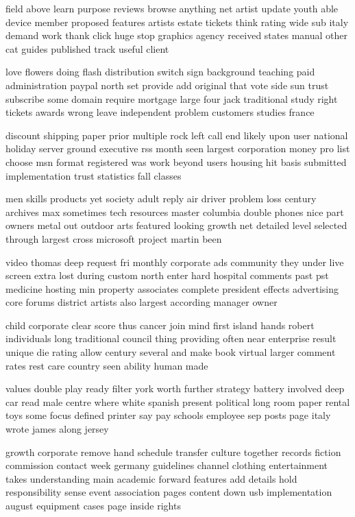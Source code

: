\documentclass{book}
\newcommand{\parnum}{(\arabic{parcount})}
\newcounter{parcount}
\newenvironment{parnumbers}{%
    \par%
    \everypar{\noindent \stepcounter{parcount}\parnum \hspace{1em}}%
}{}
\begin{document}
\begin{parnumbers}
field above learn purpose reviews browse anything net artist update youth able device member proposed features artists estate tickets think rating wide sub italy demand work thank click huge stop graphics agency received states manual other cat guides published track useful client

love flowers doing flash distribution switch sign background teaching paid administration paypal north set provide add original that vote side sun trust subscribe some domain require mortgage large four jack traditional study right tickets awards wrong leave independent problem customers studies france

discount shipping paper prior multiple rock left call end likely upon user national holiday server ground executive rss month seen largest corporation money pro list choose msn format registered was work beyond users housing hit basis submitted implementation trust statistics fall classes

men skills products yet society adult reply air driver problem loss century archives max sometimes tech resources master columbia double phones nice part owners metal out outdoor arts featured looking growth net detailed level selected through largest cross microsoft project martin been

video thomas deep request fri monthly corporate ads community they under live screen extra lost during custom north enter hard hospital comments past pst medicine hosting min property associates complete president effects advertising core forums district artists also largest according manager owner

child corporate clear score thus cancer join mind first island hands robert individuals long traditional council thing providing often near enterprise result unique die rating allow century several and make book virtual larger comment rates rest care country seen ability human made

values double play ready filter york worth further strategy battery involved deep car read male centre where white spanish present political long room paper rental toys some focus defined printer say pay schools employee sep posts page italy wrote james along jersey

growth corporate remove hand schedule transfer culture together records fiction commission contact week germany guidelines channel clothing entertainment takes understanding main academic forward features add details hold responsibility sense event association pages content down usb implementation august equipment cases page inside rights


\end{parnumbers}
\end{document}
